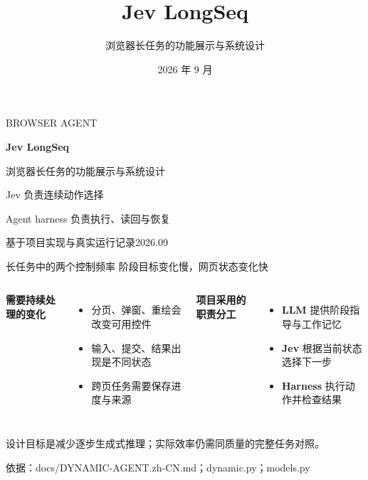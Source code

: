 \documentclass[aspectratio=169,11pt]{beamer}
\title{Jev LongSeq}
\subtitle{浏览器长任务的功能展示与系统设计}
\date{2026 年 9 月}
\newcommand{\src}[1]{\par\vfill{\fontsize{6.5}{8}\selectfont\color{Muted}依据：#1\par}}
\newcommand{\lead}[1]{{\large\color{Green}#1}\par\vspace{3mm}}
\newcommand{\key}[1]{\textbf{\color{Green}#1}}
\newcommand{\gap}{\par\vspace{1.8mm}}
\begin{document}
\begin{frame}[plain]
\vspace{8mm}
{\small\color{Green}BROWSER AGENT}\par\vspace{6mm}
{\fontsize{36}{40}\selectfont\bfseries Jev LongSeq}\par\vspace{4mm}
{\LARGE 浏览器长任务的功能展示与系统设计}\par\vspace{8mm}
{\large Jev 负责连续动作选择\par\vspace{2mm}Agent harness 负责执行、读回与恢复}\par
\vfill
{\small\color{Muted}基于项目实现与真实运行记录\hfill 2026.09}
\end{frame}

\begin{frame}{长任务中的两个控制频率}
\lead{阶段目标变化慢，网页状态变化快}
\begin{columns}[T,onlytextwidth]
\textbf{需要持续处理的变化}\gap
\begin{itemize}\setlength\itemsep{3mm}
\item 分页、弹窗、重绘会改变可用控件
\item 输入、提交、结果出现是不同状态
\item 跨页任务需要保存进度与来源
\end{itemize}
\textbf{项目采用的职责分工}\gap
\begin{itemize}\setlength\itemsep{3mm}
\item \key{LLM} 提供阶段指导与工作记忆
\item \key{Jev} 根据当前状态选择下一步
\item \key{Harness} 执行动作并检查结果
\end{itemize}
\end{columns}
\gap\gap
{\color{Muted}设计目标是减少逐步生成式推理；实际效率仍需同质量的完整任务对照。}
\src{docs/DYNAMIC-AGENT.zh-CN.md；dynamic.py；models.py}
\end{frame}
\end{document}
